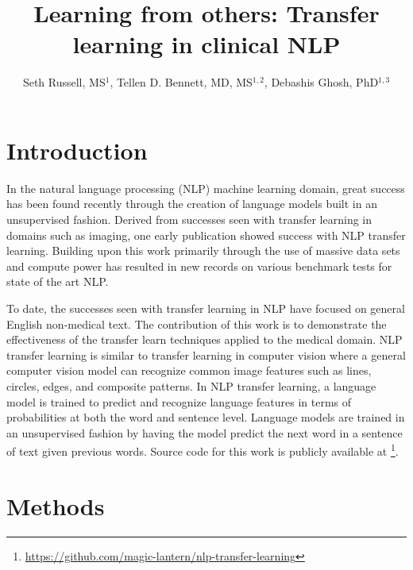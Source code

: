 \documentclass{amia}
\begin{document}
\title{Learning from others: Transfer learning in clinical NLP}

\author{Seth Russell, MS$^{1}$,
    Tellen D. Bennett, MD, MS$^{1,2}$,
    Debashis Ghosh, PhD$^{1,3}$}


\maketitle

\section*{Introduction}

In the natural language processing (NLP) machine learning domain, great success has been found recently through the creation of language models built in an unsupervised fashion. Derived from successes seen with transfer learning in domains such as imaging, one early publication \cite{howard_universal_2018} showed success with NLP transfer learning. Building upon this work primarily through the use of massive data sets and compute power \cite{radford_language_2019} has resulted in new records on various benchmark tests for state of the art NLP.

To date, the successes seen with transfer learning in NLP have focused on general English non-medical text. The contribution of this work is to demonstrate the effectiveness of the transfer learn techniques applied to the medical domain. NLP transfer learning is similar to transfer learning in computer vision where a general computer vision model can recognize common image features such as lines, circles, edges, and composite patterns. In NLP transfer learning, a language model is trained to predict and recognize language features in terms of probabilities at both the word and sentence level. Language models are trained in an unsupervised fashion by having the model predict the next word in a sentence of text given previous words. Source code for this work is publicly available at \footnote{\url{https://github.com/magic-lantern/nlp-transfer-learning}}.

\section*{Methods}
\end{document}
